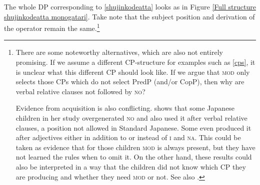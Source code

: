 The whole DP corresponding to \ref{shujinkodeatta} looks as in Figure \ref{Full structure shujinkodeatta monogatari}. Take note that the subject position and derivation of the operator remain the same.\footnote{There are some noteworthy alternatives, which are also not entirely promising. If we assume a different CP-structure for examples such as \ref{cps}, it is unclear what this different CP should look like. If we argue that \textsc{mod} only selects those CPs which do not select PredP (and/or CopP), then why are verbal relative clauses not followed by \textsc{no}?

\par

Evidence from acquisition is also conflicting. \citet[§ 4 and 5]{murasugi:1991:noun} shows that some Japanese children in her study overgenerated \textsc{no} and also used it after verbal relative clauses, a position not allowed in Standard Japanese. Some even produced it after adjectives either in addition to or instead of \textsc{i} and \textsc{na}. This could be taken as evidence that for those children \textsc{mod} is always present, but they have not learned the rules when to omit it. On the other hand, these results could also be interpreted in a way that the children did not know which CP they are producing and whether they need \textsc{mod} or not. See also \citet[§ 3.5]{yamakido:2005:nature}.}


